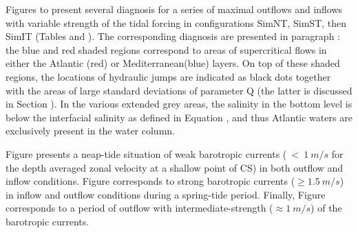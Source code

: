 Figures  to  present several diagnosis for a series of maximal outflows and inflows with variable strength of the tidal forcing in configurations SimNT, SimST, then SimIT (Tables  and ). The corresponding diagnosis are presented in paragraph : the blue and red shaded regions correspond to areas of supercritical flows %
in either the Atlantic (red) or Mediterranean(blue) layers. On top of these shaded regions, the locations of hydraulic jumps are indicated as black dots%
together with the areas of large standard deviations of parameter Q %
(the latter is discussed in Section ). In the various extended grey areas, the salinity in the bottom level is below the interfacial salinity as defined in Equation , and thus Atlantic waters are exclusively present in the water column. 

Figure  presents a neap-tide situation of weak barotropic currents ($\ <\ 1\ m/s$ for the depth averaged zonal velocity at a shallow point of CS) in both outflow and inflow conditions. Figure  corresponds to strong barotropic currents ($\geq 1.5\ m/s$) in inflow and outflow conditions during a spring-tide period. Finally, Figure  corresponds to a period of outflow with intermediate-strength ($\approx 1\ m/s$) of the barotropic currents.


